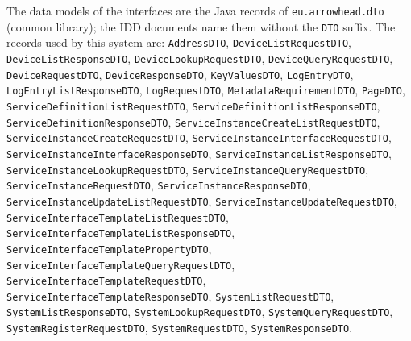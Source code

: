 \documentclass[a4paper]{arrowhead}
\begin{document}
The data models of the interfaces are the Java records of \texttt{eu.arrowhead.dto} (common library); the IDD documents name them without the \texttt{DTO} suffix. The records used by this system are: \texttt{AddressDTO}, \texttt{Device\allowbreak{}List\allowbreak{}Request\allowbreak{}DTO}, \texttt{Device\allowbreak{}List\allowbreak{}Response\allowbreak{}DTO}, \texttt{Device\allowbreak{}Lookup\allowbreak{}Request\allowbreak{}DTO}, \texttt{Device\allowbreak{}Query\allowbreak{}Request\allowbreak{}DTO}, \texttt{DeviceRequestDTO}, \texttt{DeviceResponseDTO}, \texttt{KeyValuesDTO}, \texttt{LogEntryDTO}, \texttt{Log\allowbreak{}Entry\allowbreak{}List\allowbreak{}Response\allowbreak{}DTO}, \texttt{LogRequestDTO}, \texttt{Metadata\allowbreak{}Requirement\allowbreak{}DTO}, \texttt{PageDTO}, \texttt{Service\allowbreak{}Definition\allowbreak{}List\allowbreak{}Request\allowbreak{}DTO}, \texttt{Service\allowbreak{}Definition\allowbreak{}List\allowbreak{}Response\allowbreak{}DTO}, \texttt{Service\allowbreak{}Definition\allowbreak{}Response\allowbreak{}DTO}, \texttt{Service\allowbreak{}Instance\allowbreak{}Create\allowbreak{}List\allowbreak{}Request\allowbreak{}DTO}, \texttt{Service\allowbreak{}Instance\allowbreak{}Create\allowbreak{}Request\allowbreak{}DTO}, \texttt{Service\allowbreak{}Instance\allowbreak{}Interface\allowbreak{}Request\allowbreak{}DTO}, \texttt{Service\allowbreak{}Instance\allowbreak{}Interface\allowbreak{}Response\allowbreak{}DTO}, \texttt{Service\allowbreak{}Instance\allowbreak{}List\allowbreak{}Response\allowbreak{}DTO}, \texttt{Service\allowbreak{}Instance\allowbreak{}Lookup\allowbreak{}Request\allowbreak{}DTO}, \texttt{Service\allowbreak{}Instance\allowbreak{}Query\allowbreak{}Request\allowbreak{}DTO}, \texttt{Service\allowbreak{}Instance\allowbreak{}Request\allowbreak{}DTO}, \texttt{Service\allowbreak{}Instance\allowbreak{}Response\allowbreak{}DTO}, \texttt{Service\allowbreak{}Instance\allowbreak{}Update\allowbreak{}List\allowbreak{}Request\allowbreak{}DTO}, \texttt{Service\allowbreak{}Instance\allowbreak{}Update\allowbreak{}Request\allowbreak{}DTO}, \texttt{Service\allowbreak{}Interface\allowbreak{}Template\allowbreak{}List\allowbreak{}Request\allowbreak{}DTO}, \texttt{Service\allowbreak{}Interface\allowbreak{}Template\allowbreak{}List\allowbreak{}Response\allowbreak{}DTO}, \texttt{Service\allowbreak{}Interface\allowbreak{}Template\allowbreak{}Property\allowbreak{}DTO}, \texttt{Service\allowbreak{}Interface\allowbreak{}Template\allowbreak{}Query\allowbreak{}Request\allowbreak{}DTO}, \texttt{Service\allowbreak{}Interface\allowbreak{}Template\allowbreak{}Request\allowbreak{}DTO}, \texttt{Service\allowbreak{}Interface\allowbreak{}Template\allowbreak{}Response\allowbreak{}DTO}, \texttt{System\allowbreak{}List\allowbreak{}Request\allowbreak{}DTO}, \texttt{System\allowbreak{}List\allowbreak{}Response\allowbreak{}DTO}, \texttt{System\allowbreak{}Lookup\allowbreak{}Request\allowbreak{}DTO}, \texttt{System\allowbreak{}Query\allowbreak{}Request\allowbreak{}DTO}, \texttt{System\allowbreak{}Register\allowbreak{}Request\allowbreak{}DTO}, \texttt{SystemRequestDTO}, \texttt{SystemResponseDTO}.
\end{document}
